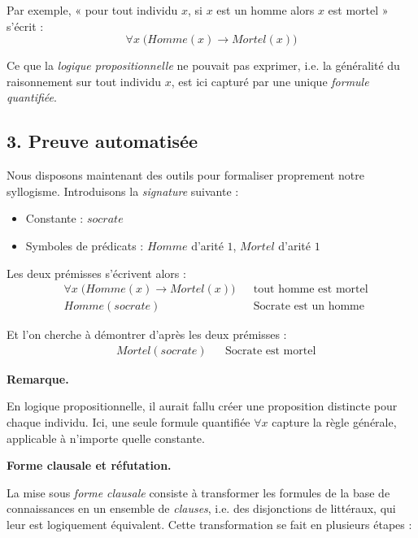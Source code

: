 \documentclass[11pt]{article}
\newenvironment{remarque}{%
    \begin{mdframed}[
        linecolor=sectioncolor!40,
        linewidth=0.8pt,
        backgroundcolor=sectioncolor!5,
        innerleftmargin=10pt,
        innerrightmargin=10pt,
        innertopmargin=6pt,
        innerbottommargin=6pt,
        skipabove=8pt,
        skipbelow=8pt
    ]
    \noindent\textbf{\small\color{sectioncolor}Remarque.}\enspace\small\itshape
}{%
    \end{mdframed}
}
\begin{document}
\vspace{0.2cm}
Par exemple, « pour tout individu $x$, si $x$ est un homme alors $x$ est mortel » s'écrit :$$
\forall x\; \bigl(\mathit{Homme}(x) \rightarrow \mathit{Mortel}(x)\bigr)
$$

Ce que la \textit{logique propositionnelle} ne pouvait pas exprimer, i.e. la généralité du raisonnement sur tout individu $x$, est ici capturé par une unique \textit{formule quantifiée}.

\subsection*{3. Preuve automatisée}
\label{preuve}
\vspace{0.4cm}

Nous disposons maintenant des outils pour formaliser proprement notre syllogisme.
Introduisons la \textit{signature} suivante :
\begin{itemize}
    \item Constante : $\mathit{socrate}$
    \item Symboles de prédicats : $\mathit{Homme}$ d'arité $1$, $\mathit{Mortel}$ d'arité $1$
\end{itemize}

Les deux prémisses s'écrivent alors :
\begin{align*}
    &\forall x\; \bigl(\mathit{Homme}(x) \rightarrow \mathit{Mortel}(x)\bigr) 
    &&\text{tout homme est mortel} \\
    &\mathit{Homme}(\mathit{socrate}) 
    &&\text{Socrate est un homme}
\end{align*}

Et l'on cherche à démontrer d'après les deux prémisses :
\begin{align*}
    &\mathit{Mortel}(\mathit{socrate})
    &&\text{Socrate est mortel}
\end{align*}

\begin{remarque}
    En logique propositionnelle, il aurait fallu créer une proposition distincte pour chaque
    individu. Ici, une seule formule quantifiée $\forall x$ capture la règle générale,
    applicable à n'importe quelle constante.
\end{remarque}

\vspace{0.4cm}
\noindent\textbf{Forme clausale et réfutation.}

\vspace{0.2cm}
La mise sous \textit{forme clausale} consiste à transformer les formules de 
la base de connaissances en un ensemble de \textit{clauses}, i.e. des disjonctions de littéraux, qui leur est logiquement équivalent. Cette transformation se fait en plusieurs étapes :
\end{document}
